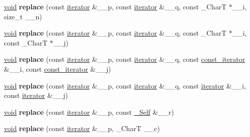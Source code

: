 \begin{DoxyCompactItemize}
\item 
\mbox{\label{classrope_ab960148d7f52cda8b840dc7db294c99b}} 
\hyperlink{interfacevoid}{void} {\bfseries replace} (const \hyperlink{class___rope__iterator}{iterator} \&\+\_\+\+\_\+p, const \hyperlink{class___rope__iterator}{iterator} \&\+\_\+\+\_\+q, const \+\_\+\+CharT $\ast$\+\_\+\+\_\+i, size\+\_\+t \+\_\+\+\_\+n)
\item 
\mbox{\label{classrope_a04cb68f072b67c03dcc50188085d7561}} 
\hyperlink{interfacevoid}{void} {\bfseries replace} (const \hyperlink{class___rope__iterator}{iterator} \&\+\_\+\+\_\+p, const \hyperlink{class___rope__iterator}{iterator} \&\+\_\+\+\_\+q, const \+\_\+\+CharT $\ast$\+\_\+\+\_\+i, const \+\_\+\+CharT $\ast$\+\_\+\+\_\+j)
\item 
\mbox{\label{classrope_a8a219553daea2fa6ee8b1d85b5207f38}} 
\hyperlink{interfacevoid}{void} {\bfseries replace} (const \hyperlink{class___rope__iterator}{iterator} \&\+\_\+\+\_\+p, const \hyperlink{class___rope__iterator}{iterator} \&\+\_\+\+\_\+q, const \hyperlink{class___rope__const__iterator}{const\+\_\+iterator} \&\+\_\+\+\_\+i, const \hyperlink{class___rope__const__iterator}{const\+\_\+iterator} \&\+\_\+\+\_\+j)
\item 
\mbox{\label{classrope_a39d0ba2935989f978b6df72938c8d85b}} 
\hyperlink{interfacevoid}{void} {\bfseries replace} (const \hyperlink{class___rope__iterator}{iterator} \&\+\_\+\+\_\+p, const \hyperlink{class___rope__iterator}{iterator} \&\+\_\+\+\_\+q, const \hyperlink{class___rope__iterator}{iterator} \&\+\_\+\+\_\+i, const \hyperlink{class___rope__iterator}{iterator} \&\+\_\+\+\_\+j)
\item 
\mbox{\label{classrope_a6821fdf848f1528b65dd42ecc75dbb57}} 
\hyperlink{interfacevoid}{void} {\bfseries replace} (const \hyperlink{class___rope__iterator}{iterator} \&\+\_\+\+\_\+p, const \hyperlink{classrope}{\+\_\+\+Self} \&\+\_\+\+\_\+r)
\item 
\mbox{\label{classrope_a01a47c9b4c4fb28347d1071c362a86a5}} 
\hyperlink{interfacevoid}{void} {\bfseries replace} (const \hyperlink{class___rope__iterator}{iterator} \&\+\_\+\+\_\+p, \+\_\+\+CharT \+\_\+\+\_\+c)
\item 
\mbox{\label{classrope_a83ea223821f3810beef91dddcc7dfe2b}} 

\end{DoxyCompactItemize}
